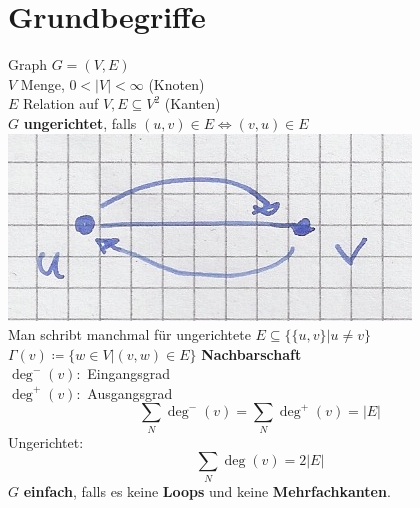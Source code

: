 \section{Grundbegriffe}
\begin{def*}[note = Graph , index = Graph]
Graph $G = (V,E)$ \\
$V$ Menge, $0 < |V| < \infty$ (Knoten) \\
$E$ Relation auf $V, E \subseteq V^2$ (Kanten) \\
$G$ \textbf{ungerichtet}, falls $(u,v) \in E \iff (v,u) \in E$\\
\includegraphics{Bild33} \\
Man schribt manchmal für ungerichtete $E \subseteq \{ \{u,v\} | u \neq v \}$\\
$\Gamma(v) \coloneqq \{ w \in V | (v,w) \in E \}$ \textbf{Nachbarschaft} \\
$\deg^-(v):$ Eingangsgrad \\
$\deg^+(v):$ Ausgangsgrad \\
\[ \sum_N \deg^-(v) = \sum_N \deg^+(v) = |E| \]
Ungerichtet:
\[ \sum_N \deg(v) = 2|E| \]
$G$ \textbf{einfach}, falls es keine \textbf{Loops} und keine \textbf{Mehrfachkanten}.
\end{def*}

